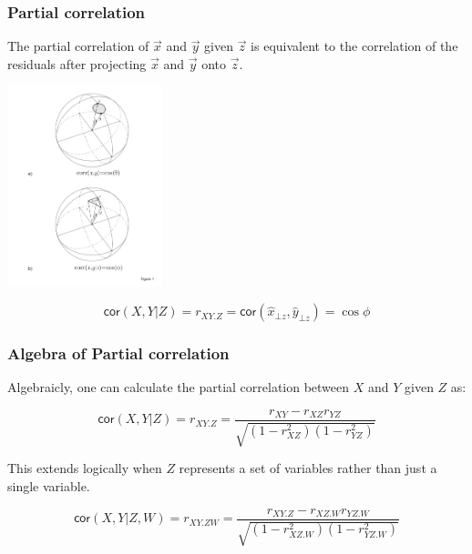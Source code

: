 \documentclass{beamer}
\begin{document}

\begin{frame}
  \frametitle{Partial correlation}

The partial correlation of $\vec{x}$ and $\vec{y}$ given $\vec{z}$ is equivalent to the correlation of the residuals after projecting $\vec{x}$ and $\vec{y}$ onto $\vec{z}$.

\begin{center}
\includegraphics[width=4.5cm]{partial-corr-sphere.pdf}
\end{center}
\[
\mathsf{cor}(X,Y|Z) = r_{XY.Z} = \mathsf{cor}(\widehat{x}_{\bot z},\widehat{y}_{\bot z}) = \cos \phi
\]


\end{frame}


\begin{frame}
  \frametitle{Algebra of Partial correlation}

Algebraicly, one can calculate the partial correlation between $X$ and $Y$ given $Z$ as:

\[
\mathsf{cor}(X,Y|Z) = r_{XY.Z} = \frac{r_{XY} - r_{XZ}r_{YZ}}{\sqrt{(1-r_{XZ}^2)(1-r_{YZ}^2)}}
\]

This extends logically when $Z$ represents a set of variables rather than just a single variable.

\[
\mathsf{cor}(X,Y|Z,W) = r_{XY.ZW} = \frac{r_{XY.Z} - r_{XZ.W}r_{YZ.W}}{\sqrt{(1-r_{XZ.W}^2)(1-r_{YZ.W}^2)}}
\]

\end{frame}
\end{document}
